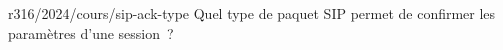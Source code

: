 \begin{question}{r316/2024/cours/sip-ack-type}
  Quel type de paquet SIP permet de confirmer les paramètres d'une
  session~?
  \begin{reponses}
  \end{reponses}
\end{question}
